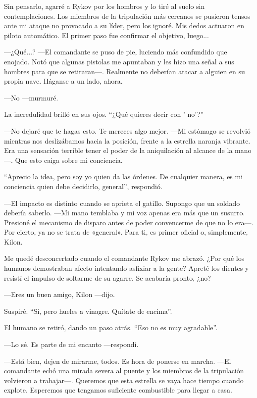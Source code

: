 Sin pensarlo, agarré a Rykov por los hombros y lo tiré al suelo sin contemplaciones. Los miembros de la tripulación más cercanos se pusieron tensos ante mi ataque no provocado a su líder, pero los ignoré. Mis dedos actuaron en piloto automático. El primer paso fue confirmar el objetivo, luego...

—¿Qué...? —El comandante se puso de pie, luciendo más confundido que enojado. Notó que algunas pistolas me apuntaban y les hizo una señal a sus hombres para que se retiraran—. Realmente no deberían atacar a alguien en su propia nave. Háganse a un lado, ahora.

—No —murmuré.

La incredulidad brilló en sus ojos. ``¿Qué quieres decir con ' no'?''

—No dejaré que te hagas esto. Te mereces algo mejor. —Mi estómago se revolvió mientras nos deslizábamos hacia la posición, frente a la estrella naranja vibrante. Era una sensación terrible tener el poder de la aniquilación al alcance de la mano—. Que esto caiga sobre mi conciencia.

``Aprecio la idea, pero soy yo quien da las órdenes. De cualquier manera, es mi conciencia quien debe decidirlo, general'', respondió.

—El impacto es distinto cuando se aprieta el gatillo. Supongo que un soldado debería saberlo. —Mi mano temblaba y mi voz apenas era más que un susurro. Presioné el mecanismo de disparo antes de poder convencerme de que no lo era—. Por cierto, ya no se trata de «general». Para ti, es primer oficial o, simplemente, Kilon.

Me quedé desconcertado cuando el comandante Rykov me abrazó. ¿Por qué los humanos demostraban afecto intentando asfixiar a la gente? Apreté los dientes y resistí el impulso de soltarme de su agarre. Se acabaría pronto, ¿no?

—Eres un buen amigo, Kilon —dijo.

Suspiré. ``Sí, pero hueles a vinagre. Quítate de encima''.

El humano se retiró, dando un paso atrás. ``Eso no es muy agradable''.

—Lo sé. Es parte de mi encanto —respondí.

—Está bien, dejen de mirarme, todos. Es hora de ponerse en marcha. —El comandante echó una mirada severa al puente y los miembros de la tripulación volvieron a trabajar—. Queremos que esta estrella se vaya hace tiempo cuando explote. Esperemos que tengamos suficiente combustible para llegar a casa.

